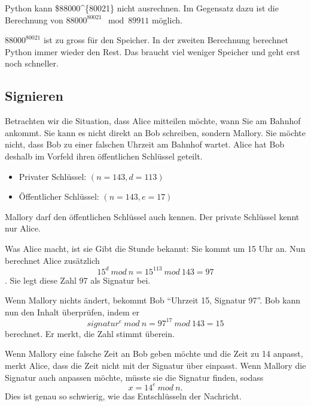 \documentclass[
  nswissgerman,
  a4paper,
  DIV=11,
  numbers=noendperiod,
  ngerman]{scrreprt}
\providecommand{\tightlist}{%
  \setlength{\itemsep}{0pt}\setlength{\parskip}{0pt}}
\begin{document}
\begin{tcolorbox}[enhanced jigsaw, arc=.35mm, bottomrule=.15mm, bottomtitle=1mm, breakable, colback=white, colbacktitle=quarto-callout-note-color!10!white, colframe=quarto-callout-note-color-frame, coltitle=black, left=2mm, leftrule=.75mm, opacityback=0, opacitybacktitle=0.6, rightrule=.15mm, title=\textcolor{quarto-callout-note-color}{\faInfo}\hspace{0.5em}{Zusätzlicher Hintergrund zum Rechnen}, titlerule=0mm, toprule=.15mm, toptitle=1mm]

Python kann \$88000\^{}\{80021\} nicht ausrechnen. Im Gegensatz dazu ist
die Berechnung von \(88000^{80021} \mod 89911\) möglich.

\(88000^{80021}\) ist zu gross für den Speicher. In der zweiten
Berechnung berechnet Python immer wieder den Rest. Das braucht viel
weniger Speicher und geht erst noch schneller.

\end{tcolorbox}

\subsection{Signieren}\label{signieren}

Betrachten wir die Situation, dass Alice mitteilen möchte, wann Sie am
Bahnhof ankommt. Sie kann es nicht direkt an Bob schreiben, sondern
Mallory. Sie möchte nicht, dass Bob zu einer falschen Uhrzeit am Bahnhof
wartet. Alice hat Bob deshalb im Vorfeld ihren öffentlichen Schlüssel
geteilt.

\begin{itemize}
\tightlist
\item
  Privater Schlüssel: \((n=143, d=113)\)
\item
  Öffentlicher Schlüssel: \((n=143,e=17)\)
\end{itemize}

Mallory darf den öffentlichen Schlüssel auch kennen. Der private
Schlüssel kennt nur Alice.

Was Alice macht, ist sie Gibt die Stunde bekannt: Sie kommt um 15 Uhr
an. Nun berechnet Alice zusätzlich \[ 15^d ~mod~ n = 15^{113} ~mod~ 143
= 97 \]. Sie legt diese Zahl 97 als Signatur bei.

Wenn Mallory nichts ändert, bekommt Bob ``Uhrzeit 15, Signatur 97''. Bob
kann nun den Inhalt überprüfen, indem er \[ signatur ^ e ~mod~ n = 97
^{17} ~mod~ 143 = 15 \] berechnet. Er merkt, die Zahl stimmt überein.

Wenn Mallory eine falsche Zeit an Bob geben möchte und die Zeit zu 14
anpasst, merkt Alice, dass die Zeit nicht mit der Signatur über
einpasst. Wenn Mallory die Signatur auch anpassen möchte, müsste sie die
Signatur finden, sodass \[ x = 14^e ~mod~n. \] Dies ist genau so
schwierig, wie das Entschlüsseln der Nachricht.
\end{document}
